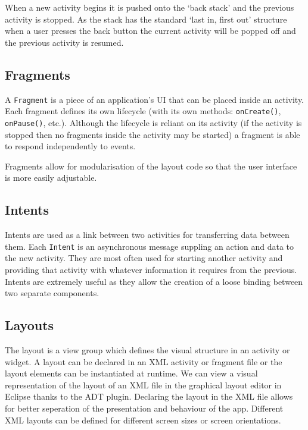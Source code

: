 \documentclass{report}
\begin{document}
When a new activity begins it is pushed onto the `back stack' and the previous activity is stopped. As the stack has the standard `last in, first out' structure when a user presses the back button the current activity will be popped off and the previous activity is resumed. 

\subsection{Fragments}
\label{sub:fragments}

A {\tt Fragment} is a piece of an application's UI that can be placed inside an activity. Each fragment defines its own lifecycle (with its own methods: {\tt onCreate()}, {\tt onPause()}, etc.). Although the lifecycle is reliant on its activity (if the activity is stopped then no fragments inside the activity may be started) a fragment is able to respond independently to events.

Fragments allow for modularisation of the layout code so that the user interface is more easily adjustable.

\subsection{Intents}
\label{sub:intents}

Intents are used as a link between two activities for transferring data between them. Each {\tt Intent} is an asynchronous message suppling an action and data to the new activity. They are most often used for starting another activity and providing that activity with whatever information it requires from the previous. Intents are extremely useful as they allow the creation of a loose binding between two separate components.

\subsection{Layouts}
\label{sub:layouts}

The layout is a view group which defines the visual structure in an activity or widget. A layout can be declared in an XML activity or fragment file or the layout elements can be instantiated at runtime. We can view a visual representation of the layout of an XML file in the graphical layout editor in Eclipse thanks to the ADT plugin. Declaring the layout in the XML file allows for better seperation of the presentation and behaviour of the app. Different XML layouts can be defined for different screen sizes or screen orientations. 
\end{document}
